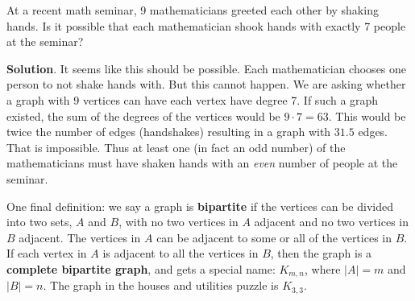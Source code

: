 \documentclass[11pt,]{book}
\newcommand{\terminology}[1]{\textbf{#1}}
\theoremstyle{ptxplainnotitle}
\theoremstyle{ptxplaintitle}
\theoremstyle{ptxdefinitionnotitle}
\theoremstyle{ptxdefinitiontitle}
\theoremstyle{ptxdefinitionnotitle}
\theoremstyle{ptxdefinitiontitle}
\theoremstyle{ptxdefinitionnotitle}
\theoremstyle{ptxdefinitiontitle}
\theoremstyle{ptxdefinitiontitlenonumber}
\theoremstyle{ptxdefinitiontitlenonumber}
\numberwithin{equation}{chapter}
\begin{document}
\begin{example}\label{example-79}
\hypertarget{p-2755}{}%
At a recent math seminar, 9 mathematicians greeted each other by shaking hands. Is it possible that each mathematician shook hands with exactly 7 people at the seminar?%
\par\smallskip%
\noindent\textbf{Solution}.\hypertarget{solution-309}{}\quad%
\hypertarget{p-2756}{}%
It seems like this should be possible. Each mathematician chooses one person to not shake hands with. But this cannot happen. We are asking whether a graph with 9 vertices can have each vertex have degree 7. If such a graph existed, the sum of the degrees of the vertices would be \(9\cdot 7 = 63\). This would be twice the number of edges (handshakes) resulting in a graph with \(31.5\) edges. That is impossible. Thus at least one (in fact an odd number) of the mathematicians must have shaken hands with an \emph{even} number of people at the seminar.%
\end{example}
\hypertarget{p-2757}{}%
One final definition: we say a graph is \terminology{bipartite} if the vertices can be divided into two sets, \(A\) and \(B\), with no two vertices in \(A\) adjacent and no two vertices in \(B\) adjacent. The vertices in \(A\) can be adjacent to some or all of the vertices in \(B\). If each vertex in \(A\) is adjacent to all the vertices in \(B\), then the graph is a \terminology{complete bipartite graph}, and gets a special name: \(K_{m,n}\), where \(|A| = m\) and \(|B| = n\). The graph in the houses and utilities puzzle is \(K_{3,3}\).%
\typeout{************************************************}
\typeout{************************************************}
\end{document}
